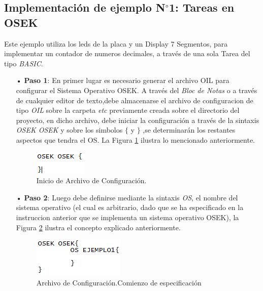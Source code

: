 \documentclass[12pt,letterpaper]{article}
\begin{document}
\subsection{Implementación de ejemplo N$^{\circ}$1: Tareas en OSEK}\label{sec:tareasOSEK}
Este ejemplo utiliza los leds de la placa y un Display 7 Segmentos, para implementar un contador de numeros decimales, a través de una sola Tarea del tipo \textit{BASIC}.
\begin{enumerate}

\item[•]\textbf{Paso 1}: En primer lugar es necesario generar el archivo OIL para configurar el Sistema Operativo OSEK. A través del \textit{Bloc de Notas} o a través de cualquier editor de texto,debe almacenarse el archivo de configuracion de tipo \textit{OIL} sobre la carpeta \textit{etc} previamente creada sobre el directorio del proyecto, en dicho archivo, debe iniciar la configuración a través de la sintaxis \textit{OSEK OSEK} y sobre los simbolos $\lbrace$ y $\rbrace$ ,se determinarán los restantes aspectos que tendra el OS. La Figura \ref{Fig35} ilustra lo mencionado anteriormente.
\begin{figure}[H]
\centering
\includegraphics[width=5 cm]{figuras/f18.png}
\caption{Inicio de Archivo de Configuración.}
\label{Fig35}
\end{figure}
\item[•]\textbf{Paso 2}: Luego debe definirse mediante la sintaxis \textit{OS}, el nombre del sistema operativo (el cual es arbitrario, dado que se ha especificado en la instruccion anterior que se implementa un sistema operativo OSEK), la Figura \ref{Fig36} ilustra el concepto explicado anteriormente.
\begin{figure}[H]
\centering
\includegraphics[width=5 cm]{figuras/f19.png}
\caption{Archivo de Configuración.Comienzo de especificación}
\label{Fig36}
\end{figure}


\end{enumerate}
\end{document}
